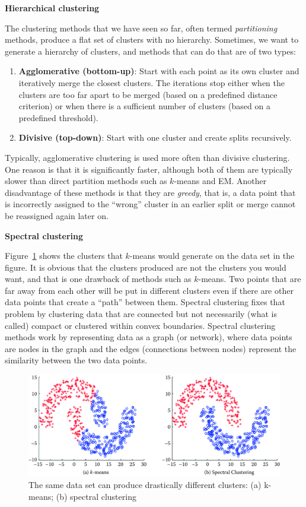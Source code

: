 \documentclass[]{krantz}
\begin{document}
\textbf{Hierarchical clustering}

\hspace*{-1pt} The clustering methods that we have seen so far, often
termed \emph{partitioning} methods, produce a flat set of clusters with
no hierarchy. Sometimes, we want to generate a hierarchy of clusters,
and methods that can do that are of two types:

\begin{enumerate}
\def\labelenumi{\arabic{enumi}.}
\item
  \textbf{Agglomerative (bottom-up)}: Start with each point as its own
  cluster and iteratively merge the closest clusters. The iterations
  stop either when the clusters are too far apart to be merged (based on
  a predefined distance criterion) or when there is a sufficient number
  of clusters (based on a predefined threshold).
\item
  \textbf{Divisive (top-down)}: Start with one cluster and create splits
  recursively.
\end{enumerate}

Typically, agglomerative clustering is used more often than divisive
clustering. One reason is that it is significantly faster, although both
of them are typically slower than direct partition methods such as
\(k\)-means and EM. Another disadvantage of these methods is that they
are \emph{greedy}, that is, a data point that is incorrectly assigned to
the ``wrong'' cluster in an earlier split or merge cannot be reassigned
again later on.

\textbf{Spectral clustering}

Figure~\ref{fig:spectral} shows the clusters that \(k\)-means would
generate on the data set in the figure. It is obvious that the clusters
produced are not the clusters you would want, and that is one drawback
of methods such as \(k\)-means. Two points that are far away from each
other will be put in different clusters even if there are other data
points that create a ``path'' between them. Spectral clustering fixes
that problem by clustering data that are connected but not necessarily
(what is called) compact or clustered within convex boundaries. Spectral
clustering methods work by representing data as a graph (or network),
where data points are nodes in the graph and the edges (connections
between nodes) represent the similarity between the two data points.

\begin{figure}

{\centering \includegraphics[width=0.7\linewidth]{ChapterML/figures/spectral} 

}

\caption{The same data set can produce drastically different clusters: (a) k-means; (b) spectral clustering}\label{fig:spectral}
\end{figure}
\end{document}
